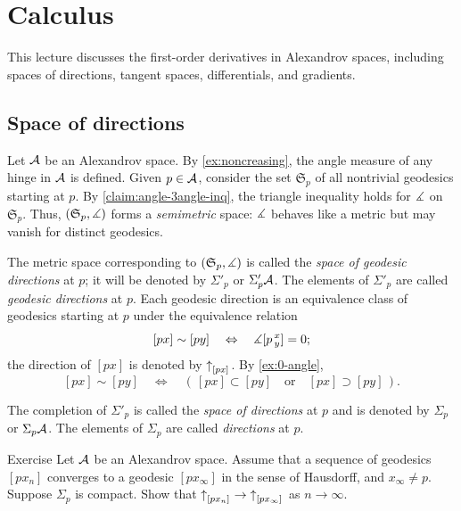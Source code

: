 
\chapter{Calculus}\label{chap:derivative}

This lecture discusses the first-order derivatives in Alexandrov spaces, including spaces of directions, tangent spaces, differentials, and gradients.

\section{Space of directions} 
\label{sec:space+directions}


Let $\mathcal{A}$ be an Alexandrov space.
By \ref{ex:noncreasing}, the angle measure of any hinge in $\mathcal{A}$ is defined.
Given $p\in \mathcal{A}$, consider the set $\mathfrak{S}_p$ of all nontrivial geodesics starting at $p$.
By \ref{claim:angle-3angle-inq}, the triangle inequality holds for $\measuredangle$ on $\mathfrak{S}_p$.
Thus, $(\mathfrak{S}_p,\measuredangle)$ forms a \emph{semimetric} space:
$\measuredangle$ behaves like a metric but may vanish for distinct geodesics.


The metric space corresponding to $(\mathfrak{S}_p,\measuredangle)$ is called the \emph{space of geodesic directions} at $p$; it will be denoted by $\Sigma'_p$ or $\Sigma'_p\mathcal{A}$.
The elements of $\Sigma'_p$ are called \emph{geodesic directions} at $p$.
Each geodesic direction is an equivalence class of geodesics starting at $p$ under the equivalence relation
\[[px]\sim[py]
\quad\Leftrightarrow\quad
\measuredangle[p\,{}^{x}_{y}]=0;\]
the direction of $[px]$ is denoted by ${\uparrow}_{[{p}{x}]_{{}}}$.
By \ref{ex:0-angle}, 
\[[px]\sim[py]
\quad\Leftrightarrow\quad
(\,[px]\subset [py]
\quad\text{or}\quad
[px]\supset[py]\,).
\]
 
The completion of $\Sigma'_p$ is called the \emph{space of directions} at $p$ and is denoted by $\Sigma_p$ or $\Sigma_p\mathcal{A}$.
The elements of $\Sigma_p$ are called \emph{directions} at $p$.

\begin{thm}{Exercise}\label{ex:dir-compact}
Let $\mathcal{A}$ be an Alexandrov space.
Assume that a sequence of geodesics $[px_n]$ converges to a geodesic $[px_\infty]$ in the sense of Hausdorff,
and $x_\infty\ne p$.
Suppose $\Sigma_p$ is compact.
Show that $\dir p{x_n}\z\to\dir p{x_\infty}$ as $n\to\infty$.

\end{thm}


